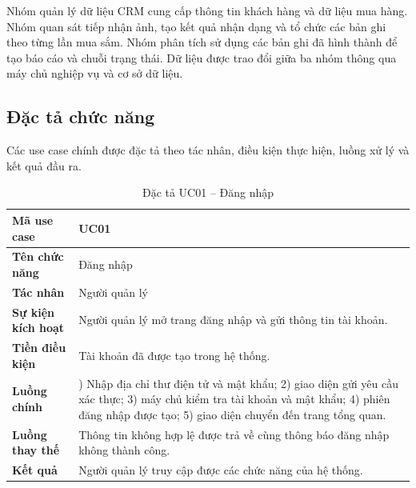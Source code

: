 \documentclass[../LuanVan.tex]{subfiles}
\begin{document}
Nhóm quản lý dữ liệu CRM cung cấp thông tin khách hàng và dữ liệu mua hàng. Nhóm quan sát tiếp nhận ảnh, tạo kết quả nhận dạng và tổ chức các bản ghi theo từng lần mua sắm. Nhóm phân tích sử dụng các bản ghi đã hình thành để tạo báo cáo và chuỗi trạng thái. Dữ liệu được trao đổi giữa ba nhóm thông qua máy chủ nghiệp vụ và cơ sở dữ liệu.

\subsection{Đặc tả chức năng}
\label{subsection:4.2.3}

Các use case chính được đặc tả theo tác nhân, điều kiện thực hiện, luồng xử lý và kết quả đầu ra.

\begin{table}[H]
    \centering
    \caption{Đặc tả UC01 -- Đăng nhập}
    \label{tab:uc01_login_ch4}
    \begin{tabular}{|>{\raggedright\arraybackslash}p{3.0cm}|>{\raggedright\arraybackslash}p{10.9cm}|}
        \hline
        \textbf{Mã use case} & UC01 \\
        \hline
        \textbf{Tên chức năng} & Đăng nhập \\
        \hline
        \textbf{Tác nhân} & Người quản lý \\
        \hline
        \textbf{Sự kiện kích hoạt} & Người quản lý mở trang đăng nhập và gửi thông tin tài khoản. \\
        \hline
        \textbf{Tiền điều kiện} & Tài khoản đã được tạo trong hệ thống. \\
        \hline
        \textbf{Luồng chính} & 1) Nhập địa chỉ thư điện tử và mật khẩu; 2) giao diện gửi yêu cầu xác thực; 3) máy chủ kiểm tra tài khoản và mật khẩu; 4) phiên đăng nhập được tạo; 5) giao diện chuyển đến trang tổng quan. \\
        \hline
        \textbf{Luồng thay thế} & Thông tin không hợp lệ được trả về cùng thông báo đăng nhập không thành công. \\
        \hline
        \textbf{Kết quả} & Người quản lý truy cập được các chức năng của hệ thống. \\
        \hline
    \end{tabular}
\end{table}
\end{document}
